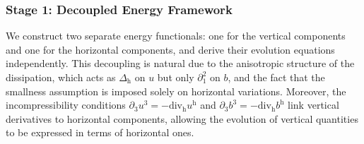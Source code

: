 \documentclass[11pt]{amsart}
\theoremstyle{definition}
\numberwithin{equation}{section}
\begin{document}
\subsubsection{Stage 1: Decoupled Energy Framework}

We construct two separate energy functionals: one for the vertical components and one for the horizontal components, and derive their evolution equations independently. This decoupling is natural due to the anisotropic structure of the dissipation, which acts as $\Delta_\mathrm{h}$ on $u$ but only $\partial_1^2$ on $b$, and the fact that the smallness assumption is imposed solely on horizontal variations. Moreover, the incompressibility conditions $\partial_3 u^3 = -\mathrm{div}_\mathrm{h} u^\mathrm{h}$ and $\partial_3 b^3 = -\mathrm{div}_\mathrm{h} b^\mathrm{h}$ link vertical derivatives to horizontal components, allowing the evolution of vertical quantities to be expressed in terms of horizontal ones.

\end{document}
